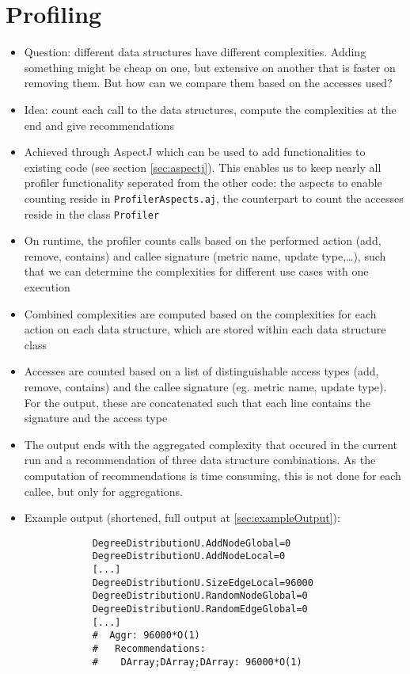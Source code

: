 \section{Profiling}
	\begin{itemize}
		\item Question: different data structures have different complexities. Adding something
			might be cheap on one, but extensive on another that is faster on removing them. But
			how can we compare them based on the accesses used?
		\item Idea: count each call to the data structures, compute the complexities at the
			end and give recommendations
		\item Achieved through AspectJ which can be used to add functionalities to existing code
			(see section \ref{sec:aspectj}). This enables us to keep nearly all profiler
			functionality seperated from the other code: the aspects to enable counting reside in
			\texttt{ProfilerAspects.aj}, the counterpart to count the accesses reside in
			the class \texttt{Profiler}
		\item On runtime, the profiler counts calls based on the performed action (add, remove,
			contains) and callee signature (metric name, update type,\ldots), such that we can
			determine the complexities for different use cases with one execution
		\item Combined complexities are computed based on the complexities for each action on
			each data structure, which are stored within each data structure class
		\item Accesses are counted based on a list of distinguishable access types (add,
			remove, contains) and the callee signature (eg. metric name, update type). For the
			output, these are concatenated such that each line contains the signature and the
			access type
		\item The output ends with the aggregated complexity that occured in the current run and
			a recommendation of three data structure combinations. As the computation of
			recommendations is time consuming, this is not done for each callee, but only for
			aggregations.
		\item Example output (shortened, full output at \ref{sec:exampleOutput}):
			
		\begin{verbatim}
			DegreeDistributionU.AddNodeGlobal=0
			DegreeDistributionU.AddNodeLocal=0
			[...]
			DegreeDistributionU.SizeEdgeLocal=96000
			DegreeDistributionU.RandomNodeGlobal=0
			DegreeDistributionU.RandomEdgeGlobal=0
			[...]
			#  Aggr: 96000*O(1)
			#   Recommendations:
			#    DArray;DArray;DArray: 96000*O(1)
		\end{verbatim}			
			

\end{itemize}
